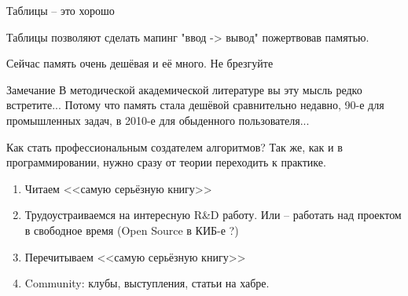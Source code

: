 \begin{frame}{Таблицы -- это хорошо}
	
	Таблицы позволяют сделать мапинг "ввод -> вывод" пожертвовав памятью.
	
	Сейчас память очень дешёвая и её много. Не брезгуйте
	
	\begin{block}{Замечание}
		В методической академической литературе вы эту мысль редко встретите...
		Потому что память стала дешёвой сравнительно недавно, 90-е для промышленных задач, в 2010-е для обыденного пользователя...
	\end{block}


	
\end{frame}











\begin{frame}{Как стать профессиональным создателем алгоритмов?}
	Так же, как и в программировании, нужно сразу от теории переходить к практике.
	
	\begin{enumerate}
		\item Читаем <<самую серьёзную книгу>>
		\item Трудоустраиваемся на интересную R\&D работу. Или -- работать над проектом в свободное время (Open Source в КИБ-е ?)
		\item Перечитываем <<самую серьёзную книгу>>
		\item Community: клубы, выступления, статьи на хабре. 
	\end{enumerate}
	
	 
\end{frame}


